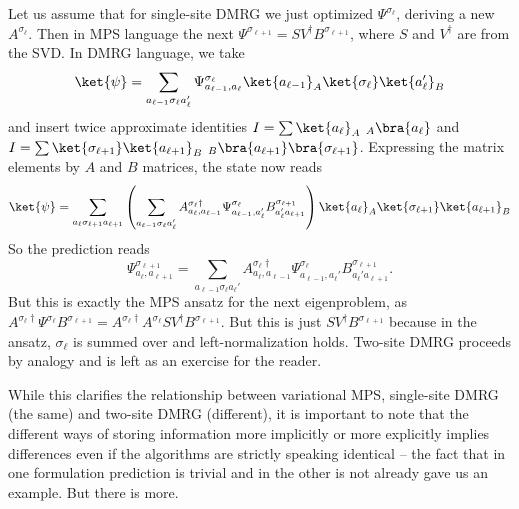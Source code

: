 Let us assume that for single-site DMRG we just optimized $\Psi^{\sigma_\ell}$, deriving a new $A^{\sigma_ \ell}$. Then in MPS language the next $\Psi^{\sigma_{\ell +1}}= SV^{\dagger} B^{\sigma_{\ell +1}}$, where $S$ and $V^\dagger$ are from the SVD. In DMRG language, we take
\begin{equation}
\ket{\psi} = \sum_{a_{\ell-1}\sigma_ \ell a_{\ell }'} \Psi^{\sigma_ \ell}_{a_{\ell-1}, a_{\ell }} \ket{a_{\ell-1}}_A \ket{\sigma_ \ell} \ket{a_{\ell}'}_B
\end{equation}
and insert twice approximate identities $I= \sum \ket{a_ \ell}_A\phantom\langle_A\bra{a_ \ell}$ and 
$I= \sum \ket{\sigma_{\ell +1}}\ket{a_{\ell+1}}_B \phantom\langle_B\bra{a_{\ell +1}} \bra{\sigma_{\ell+1}}$. Expressing the matrix elements by $A$ and $B$ matrices, the state now reads
\begin{equation}
\ket{\psi} = \sum_{a_\ell\sigma_{\ell +1} a_{\ell +1}} \left( \sum_{a_{\ell-1}\sigma_ \ell  a_{\ell}'} 
A^{\sigma_ \ell \dagger}_{a_ \ell,a_{\ell-1}} \Psi^{\sigma_ \ell}_{a_{\ell-1}, a_{\ell}'}  B^{\sigma_{\ell +1}}_{a_{\ell}' a_{\ell +1}} \right) 
\ket{a_{\ell}}_A \ket{\sigma_{\ell +1}} \ket{a_{\ell +1}}_B
\end{equation}
So the  prediction reads
\begin{equation}
\Psi^{\sigma_{\ell +1}}_{a_{\ell}, a_{\ell+1}} = 
\sum_{a_{\ell-1}\sigma_ \ell a_{\ell}'} 
A^{\sigma_ \ell \dagger}_{a_ \ell,a_{\ell-1}} \Psi^{\sigma_ \ell}_{a_{\ell-1}, a_{\ell}'}  B^{\sigma_{\ell +1}}_{a_{\ell}' a_{\ell +1}} .
\end{equation}
But this is exactly the MPS ansatz for the next eigenproblem, as $ A^{\sigma_ \ell \dagger} \Psi^{\sigma_ \ell}  B^{\sigma_{\ell +1}} =
A^{\sigma_ \ell \dagger} A^{\sigma_ \ell } S V^{\dagger} B^{\sigma_{\ell +1}}$. But this is just 
$S V^{\dagger} B^{\sigma_{\ell +1}}$ because in the ansatz, $\sigma_ \ell $ is summed over and left-normalization holds. Two-site DMRG proceeds by analogy and is left as an exercise for the reader.

While this clarifies the relationship between variational MPS, single-site DMRG (the same) and two-site DMRG (different), it is important to note that the different ways of storing information more implicitly or more explicitly implies differences even if the algorithms are strictly speaking identical -- the fact that in one formulation prediction is trivial and in the other is not already gave us an example. But there is more.


